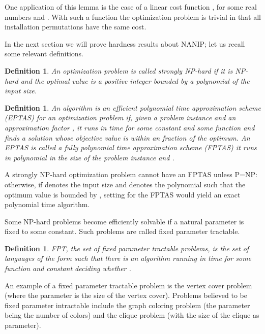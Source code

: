 \documentclass[english]{llncs}
\newtheorem{defn}[thm]{Definition}
\begin{document}
One application of this lemma is the case of a linear cost function
, for some real numbers  and .  With such a function the
optimization problem is trivial in that all installation permutations have the
same cost.

In the next section we will prove hardness results about NANIP; let us recall
some relevant definitions.

\begin{defn}

An optimization problem is called \emph{strongly NP-hard} if it is NP-hard and
the optimal value is a positive integer bounded by a polynomial of the input
size.

\end{defn}


\begin{defn}

An algorithm is an \emph{efficient polynomial time approximation scheme
(EPTAS)} for an optimization problem if, given a problem instance and an
approximation factor , it runs in time 
for some constant  and some function  and finds a solution whose
objective value is within an  fraction of the optimum. An EPTAS is
called a \emph{fully polynomial time approximation scheme (FPTAS)} it runs in
polynomial in the size of the problem instance and .  

\end{defn}

A strongly NP-hard optimization problem cannot have an FPTAS unless
P=NP: otherwise, if  denotes the input size and  denotes the polynomial
such that the optimum value is bounded by , setting
 for the FPTAS would yield an exact polynomial
time algorithm.

Some NP-hard problems become efficiently solvable if a natural parameter is
fixed to some constant. Such problems are called fixed parameter tractable.

\begin{defn}
FPT, the set of \emph{fixed parameter tractable} problems, is the set
of languages  of the form 
such that there is an algorithm running in time  for some function
 and constant  deciding whether .
\end{defn}

An example of a fixed parameter tractable problem is the vertex cover problem
(where the parameter is the size of the vertex cover). 
Problems believed to be fixed parameter intractable include the graph coloring problem
(the parameter being the number of colors) and the clique problem (with the size of 
the clique as parameter).
\end{document}
